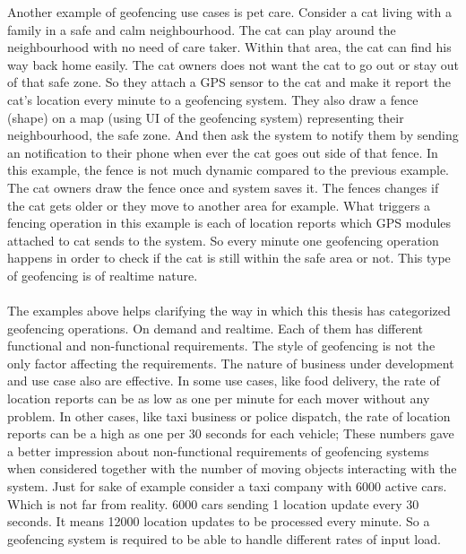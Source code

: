 \documentclass[a4]{report}
\begin{document}
    Another example of geofencing use cases is pet care\cite{pet-geofencing}.
    Consider a cat living with a family in a safe and calm neighbourhood.
    The cat can play around the neighbourhood with no need of care taker.
    Within that area, the cat can find his way back home easily.
    The cat owners does not want the cat to go out or stay out of that safe zone.
    So they attach a GPS sensor to the cat and make it report the cat's location every minute to a geofencing system.
    They also draw a fence (shape) on a map (using UI of the geofencing system) representing their neighbourhood, the
    safe zone.
    And then ask the system to notify them by sending an notification to their phone when ever the cat goes out side
    of that fence.
    In this example, the fence is not much dynamic compared to the previous example.
    The cat owners draw the fence once and system saves it.
    The fences changes if the cat gets older or they move to another area for example.
    What triggers a fencing operation in this example is each of location reports which GPS modules attached to cat
    sends to the system.
    So every minute one geofencing operation happens in order to check if the cat is still within the safe area or
    not.
    This type of geofencing is of realtime nature.

    \paragraph{}
    The examples above helps clarifying the way in which this thesis has categorized geofencing operations.
    On demand and realtime.
    Each of them has different functional and non-functional requirements.
    The style of geofencing is not the only factor affecting the requirements.
    The nature of business under development and use case also are effective.
    In some use cases, like food delivery, the rate of location reports can be as low as one per minute for each
    mover without any problem.
    In other cases, like taxi business or police dispatch, the rate of location reports can be a high as one per 30
    seconds for each vehicle;
    These numbers gave a better impression about non-functional requirements of geofencing systems when considered
    together with the number of moving objects interacting with the system.
    Just for sake of example consider a taxi company with 6000 active cars.
    Which is not far from reality.
    6000 cars sending 1 location update every 30 seconds.
    It means 12000 location updates to be processed every minute.
    So a geofencing system is required to be able to handle different rates of input load.
\end{document}
